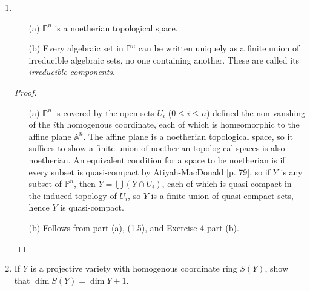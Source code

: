 \documentclass[12pt]{article}
\newcommand{\goth}[1]{\textfrak{#1}}
\newcommand{\A}{\mathbb{A}}
\newcommand{\PP}{\mathbb{P}}
\theoremstyle{definition}
\begin{document}
\begin{enumerate} [label=\textbf{\arabic*.}, leftmargin=-0.05em]
\begin{proof}
\begin{itemize}
        Conversely, let $\goth{p}$ be a homogenous prime ideal, and suppose that $Z(\goth{p}) = Y_1 \cup Y_2$. Then $\goth{p} = I(Y_1) \cap I(Y_2)$, so either $\goth{p} = I(Y_1)$ or $\goth{p} = I(Y_2)$. Thus, $Z(\goth{p}) = Y_1$ or $Y_2$, hence it is irreducible.

        \item[(c)] $I(\PP^n) = (0)$, which is a prime ideal.
    \end{itemize}
\end{proof}

\item \begin{itemize}
    \item[(a)] $\PP^n$ is a noetherian topological space.
    \item[(b)] Every algebraic set in $\PP^n$ can be written uniquely as a finite union of irreducible algebraic sets, no one containing another. These are called its \textit{irreducible components}.
\end{itemize}

\begin{proof} $ $ \vspace{0pt}
    \begin{itemize}
        \item[(a)] $\PP^n$ is covered by the open sets $U_i$ ($0 \leq i \leq n$) defined the non-vanshing of the $i$th homogenous coordinate, each of which is homeomorphic to the affine plane $\A^n$. The affine plane is a noetherian topological space, so it suffices to show a finite union of noetherian topological spaces is also noetherian. An equivalent condition for a space to be noetherian is if every subset is quasi-compact by Atiyah-MacDonald [p. 79], so if $Y$ is any subset of $\PP^n$, then $Y = \bigcup (Y \cap U_i)$, each of which is quasi-compact in the induced topology of $U_i$, so $Y$ is a finite union of quasi-compact sets, hence $Y$ is quasi-compact.

        \item[(b)] Follows from part (a), (1.5), and Exercise 4 part (b).
    \end{itemize}
\end{proof}

\item If $Y$ is a projective variety with homogenous coordinate ring $S(Y)$, show that $\dim{S(Y)} = \dim{Y} + 1$.


\end{enumerate}
\end{document}
